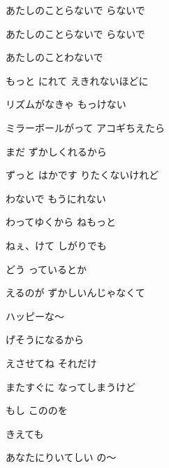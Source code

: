 \documentclass[a4paper,tate,twocolumn,12pt]{ltjtarticle}
\begin{document}
\begin{flushleft}
\begin{minipage}{\linewidth}
あたしのことらないで らないで

あたしのことらないで らないで

あたしのことわないで
\end{minipage}

\vspace{2em}

\noindent\begin{minipage}{\linewidth}
もっと にれて えきれないほどに

リズムがなきゃ もっけない

ミラーボールがって アコギちえたら

まだ ずかしくれるから

ずっと はかです りたくないけれど

わないで もうにれない

わってゆくから ねもっと

ねぇ、けて しがりでも
\end{minipage}

\vspace{2em}

\noindent\begin{minipage}{\linewidth}
どう っているとか

えるのが ずかしいんじゃなくて

ハッピーな〜

げそうになるから

えさせてね それだけ

またすぐに なってしまうけど
\end{minipage}

\vspace{2em}

\noindent\begin{minipage}{\linewidth}
もし こののを

きえても

あなたにりいてしい の〜


\end{minipage}
\end{flushleft}
\end{document}
